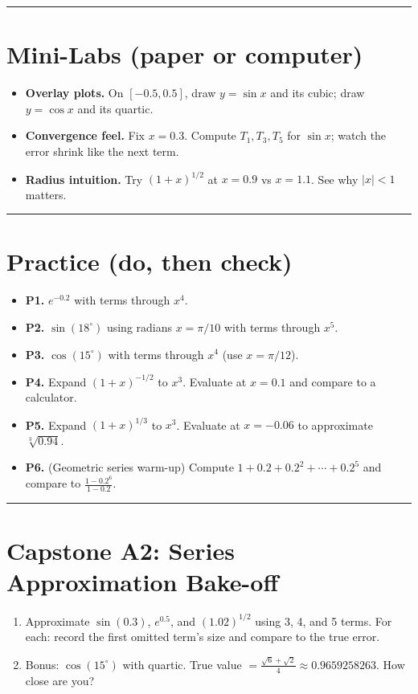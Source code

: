 \documentclass[11pt]{article}
\begin{document}
\bigskip\hrule\bigskip

\section*{Mini-Labs (paper or computer)}
\begin{itemize}
  \item \textbf{Overlay plots.} On \([-0.5,0.5]\), draw \(y=\sin x\) and its cubic; draw \(y=\cos x\) and its quartic.
  \item \textbf{Convergence feel.} Fix \(x=0.3\). Compute \(T_1,T_3,T_5\) for \(\sin x\); watch the error shrink like the next term.
  \item \textbf{Radius intuition.} Try \((1+x)^{1/2}\) at \(x=0.9\) vs \(x=1.1\). See why \(|x|<1\) matters.
\end{itemize}

\bigskip\hrule\bigskip

\section*{Practice (do, then check)}
\begin{itemize}
  \item \textbf{P1.} \(e^{-0.2}\) with terms through \(x^4\).
  \item \textbf{P2.} \(\sin(18^\circ)\) using radians \(x=\pi/10\) with terms through \(x^5\).
  \item \textbf{P3.} \(\cos(15^\circ)\) with terms through \(x^4\) (use \(x=\pi/12\)).
  \item \textbf{P4.} Expand \((1+x)^{-1/2}\) to \(x^3\). Evaluate at \(x=0.1\) and compare to a calculator.
  \item \textbf{P5.} Expand \((1+x)^{1/3}\) to \(x^3\). Evaluate at \(x=-0.06\) to approximate \(\sqrt[3]{0.94}\).
  \item \textbf{P6.} (Geometric series warm-up) Compute \(1+0.2+0.2^2+\cdots+0.2^5\) and compare to \(\frac{1-0.2^{6}}{1-0.2}\).
\end{itemize}

\bigskip\hrule\bigskip

\section*{Capstone A2: Series Approximation Bake-off}
\begin{enumerate}
  \item Approximate \(\sin(0.3)\), \(e^{0.5}\), and \((1.02)^{1/2}\) using 3, 4, and 5 terms. For each: record the first omitted term’s size and compare to the true error.
  \item Bonus: \(\cos(15^\circ)\) with quartic. True value \(=\frac{\sqrt{6}+\sqrt{2}}{4}\approx 0.9659258263\). How close are you?
\end{enumerate}
\end{document}
